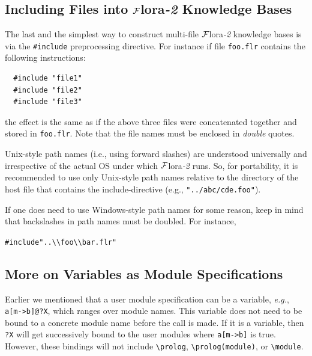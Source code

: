 \documentclass[11pt]{article}
\newcommand{\FLORA}{{\mbox{\sc ${\cal F}${lora}\rm\emph{-2}}}\xspace}
\newcommand{\FLSYSTEM}{\FLORA}
\newcommand{\flrext}{flr\xspace}
\newcommand{\bs}{\textbackslash}
\begin{document}
\subsection{Including Files into \FLSYSTEM Knowledge Bases}

The last and the simplest way to construct multi-file \FLSYSTEM 
knowledge bases is via the {\tt \#include} preprocessing directive.
For instance if file {\tt foo.\flrext} contains the following instructions:
\begin{verbatim}
  #include "file1" 
  #include "file2"
  #include "file3"
\end{verbatim}
the effect is the same as if the above three files were concatenated
together and stored in {\tt foo.\flrext}. Note that the file names must be
enclosed in \emph{double} quotes.

Unix-style path names (i.e., using forward slashes)
are understood universally and irrespective of the
actual OS under which \FLSYSTEM runs. So, for portability, it is
recommended to use only Unix-style path names relative to the directory of
the host file that contains the include-directive (e.g.,
\texttt{"../abc/cde.foo"}). 

If one does need to use Windows-style path names for some reason, keep in
mind that backslashes in path names must be doubled. For instance, 
\begin{alltt}
  #include "..\bs{}\bs{}foo\bs{}\bs{}bar.\flrext"  
\end{alltt}

\subsection{More on Variables as Module Specifications}

Earlier we mentioned that a user module specification can be a variable,
{\it e.g.}, {\tt a[m->b]@?X}, which ranges over module names. This variable
does not need to be bound to a concrete module name before the call is
made.  If it is a variable, then {\tt ?X} will get successively bound to the
user modules where {\tt a[m->b]} is true.  However, these bindings will not
include {\tt \bs{}prolog}, {\tt \bs{}prolog(module)}, or {\tt \bs{}module}.
\end{document}
